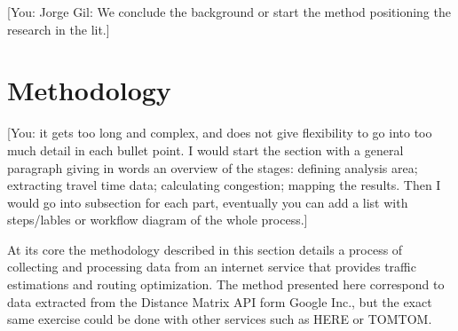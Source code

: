 \documentclass[a4paper]{jpconf}
\begin{document}
	
	
	[You: Jorge Gil: We conclude the background or start the method positioning the research in the lit.]
	
	
	
	\section{Methodology} %
	
	[You: it gets too long and complex, and does not give flexibility to go into too much detail in each bullet point. I would start the section with a general paragraph giving in words an overview of the stages: defining analysis area; extracting travel time data; calculating congestion; mapping the results. Then I would go into subsection for each part, eventually you can add a list with steps/lables or workflow diagram of the whole process.]
	
	At its core the methodology described in this section details a process of collecting and processing data from an internet service that provides traffic estimations and routing optimization. The method presented here correspond to data extracted from the Distance Matrix API form Google Inc., but the exact same exercise could be done with other services such as HERE or TOMTOM.\par
	[You: Jorge Gil: this is too specific to start, goes to the core. the processing is separate from collection, we need to make that clear. furthermore, methodology is about research, not only technology or technique. what was the aim and question, how do we try to answer it?]\par
	
\end{document}
